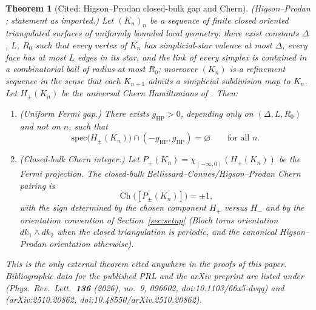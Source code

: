 \documentclass[11pt]{article}
\numberwithin{equation}{section}
\newtheorem{theorem}{Theorem}[section]
\theoremstyle{definition}
\theoremstyle{remark}
\newcommand{\spec}{\mathrm{spec}}
\newcommand{\Ch}{\operatorname{Ch}}
\begin{document}
\begin{theorem}[Cited: Higson--Prodan closed-bulk gap and Chern]\label{thm:hp_imported}
\emph{(Higson--Prodan \cite{HigsonProdanUniversalPRL,HigsonProdanUniversalArxiv}; statement as
imported.)} Let \((K_n)_n\) be a sequence of finite closed oriented triangulated surfaces of
uniformly bounded local geometry: there exist constants \(\Delta\), \(L\), \(R_0\) such that
every vertex of \(K_n\) has simplicial-star valence at most \(\Delta\), every face has at most
\(L\) edges in its star, and the link of every simplex is contained in a combinatorial ball of
radius at most \(R_0\); moreover \((K_n)\) is a refinement sequence in the sense that each
\(K_{n+1}\) admits a simplicial subdivision map to \(K_n\). Let \(H_\pm(K_n)\) be the universal
Chern Hamiltonians of . Then:
\begin{enumerate}[label=(\roman*),leftmargin=2em]
\item (Uniform Fermi gap.) There exists \(g_{\mathrm{HP}}>0\), depending only on
\((\Delta,L,R_0)\) and not on \(n\), such that
\[
\spec\bigl(H_\pm(K_n)\bigr)\cap(-g_{\mathrm{HP}},g_{\mathrm{HP}})=\varnothing
\qquad\text{for all }n.
\]
\item (Closed-bulk Chern integer.) Let
\(P_\pm(K_n)=\chi_{(-\infty,0)}(H_\pm(K_n))\) be the Fermi projection. The closed-bulk
Bellissard--Connes/Higson--Prodan Chern pairing is
\[
\Ch\bigl([P_\pm(K_n)]\bigr)=\pm 1,
\]
with the sign determined by the chosen component \(H_+\) versus \(H_-\) and by the orientation
convention of Section~\ref{sec:setup} (Bloch torus orientation \(dk_1\wedge dk_2\) when the
closed triangulation is periodic, and the canonical Higson--Prodan orientation otherwise).
\end{enumerate}
This is the only external theorem cited anywhere in the proofs of this paper. Bibliographic
data for the published PRL and the arXiv preprint are listed under
\cite{HigsonProdanUniversalPRL} (Phys.\ Rev.\ Lett.\ \textbf{136} (2026), no.~9, 096602,
doi:10.1103/66x5-dvqq) and \cite{HigsonProdanUniversalArxiv} (arXiv:2510.20862,
doi:10.48550/arXiv.2510.20862).
\end{theorem}
\end{document}
